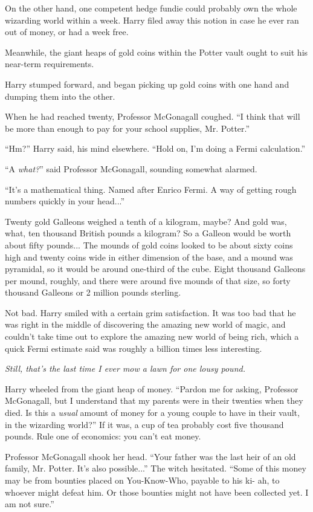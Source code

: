 On the other hand, one competent hedge fundie could probably own the whole wizarding world within a week. Harry filed away this notion in case he ever ran out of money, or had a week free.

Meanwhile, the giant heaps of gold coins within the Potter vault ought to suit his near-term requirements.

Harry stumped forward, and began picking up gold coins with one hand and dumping them into the other.

When he had reached twenty, Professor McGonagall coughed. ``I think that will be more than enough to pay for your school supplies, Mr. Potter.''

``Hm?'' Harry said, his mind elsewhere. ``Hold on, I'm doing a Fermi calculation.''

``A \emph{what?}'' said Professor McGonagall, sounding somewhat alarmed.

``It's a mathematical thing. Named after Enrico Fermi. A way of getting rough numbers quickly in your head...''

Twenty gold Galleons weighed a tenth of a kilogram, maybe? And gold was, what, ten thousand British pounds a kilogram? So a Galleon would be worth about fifty pounds... The mounds of gold coins looked to be about sixty coins high and twenty coins wide in either dimension of the base, and a mound was pyramidal, so it would be around one-third of the cube. Eight thousand Galleons per mound, roughly, and there were around five mounds of that size, so forty thousand Galleons or 2 million pounds sterling.

Not bad. Harry smiled with a certain grim satisfaction. It was too bad that he was right in the middle of discovering the amazing new world of magic, and couldn't take time out to explore the amazing new world of being rich, which a quick Fermi estimate said was roughly a billion times less interesting.

\emph{Still, that's the last time I ever mow a lawn for one lousy pound.}

Harry wheeled from the giant heap of money. ``Pardon me for asking, Professor McGonagall, but I understand that my parents were in their twenties when they died. Is this a \emph{usual} amount of money for a young couple to have in their vault, in the wizarding world?'' If it was, a cup of tea probably cost five thousand pounds. Rule one of economics: you can't eat money.

Professor McGonagall shook her head. ``Your father was the last heir of an old family, Mr. Potter. It's also possible...'' The witch hesitated. ``Some of this money may be from bounties placed on You-Know-Who, payable to his ki- ah, to whoever might defeat him. Or those bounties might not have been collected yet. I am not sure.''

